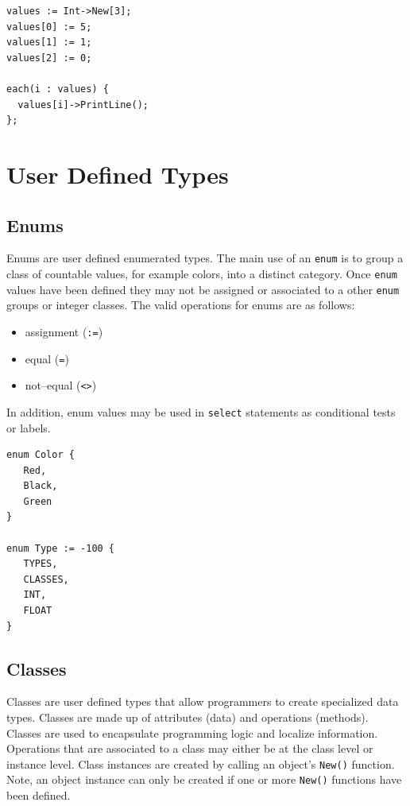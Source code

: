 \documentclass[11pt]{article}
\begin{document}
\begin{verbatim}
values := Int->New[3];
values[0] := 5;
values[1] := 1;
values[2] := 0;

each(i : values) {
  values[i]->PrintLine();
};
\end{verbatim}

\section{User Defined Types}

\subsection{Enums}
Enums are user defined enumerated types.  The main use of an
\texttt{enum} is to group a class of countable values, for example
colors, into a distinct category.  Once \texttt{enum} values have been
defined they may not be assigned or associated to a other
\texttt{enum} groups or integer classes.  The valid operations for
enums are as follows:

\begin{itemize}
\item assignment (\texttt{:=})
\item equal (\texttt{=})
\item not--equal (\texttt{<>})
\end{itemize}

In addition, enum values may be used in \texttt{select} statements as
conditional tests or labels.

\begin{verbatim}
enum Color {
   Red,
   Black,
   Green
}

enum Type := -100 {
   TYPES,
   CLASSES,
   INT,
   FLOAT
}
\end{verbatim}

\subsection{Classes}
Classes are user defined types that allow programmers to create
specialized data types.  Classes are made up of attributes (data) and
operations (methods).  Classes are used to encapsulate programming
logic and localize information.  Operations that are associated to a
class may either be at the class level or instance level.  Class
instances are created by calling an object's \texttt{New()} function.
Note, an object instance can only be created if one or more
\texttt{New()} functions have been defined.
\end{document}
